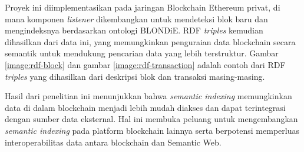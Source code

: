 Proyek ini diimplementasikan pada jaringan Blockchain Ethereum privat, di mana komponen \textit{listener} dikembangkan untuk mendeteksi blok baru dan mengindeksnya berdasarkan ontologi BLONDiE. RDF \textit{triples} kemudian dihasilkan dari data ini, yang memungkinkan penguraian data blockchain secara semantik untuk mendukung pencarian data yang lebih terstruktur. Gambar \ref{image:rdf-block} dan gambar \ref{image:rdf-transaction} adalah contoh dari RDF \textit{triples} yang dihasilkan dari deskripsi blok dan transaksi masing-masing.

Hasil dari penelitian ini menunjukkan bahwa \textit{semantic indexing} memungkinkan data di dalam blockchain menjadi lebih mudah diakses dan dapat terintegrasi dengan sumber data eksternal. Hal ini membuka peluang untuk mengembangkan \textit{semantic indexing} pada platform blockchain lainnya serta berpotensi memperluas interoperabilitas data antara blockchain dan Semantic Web.